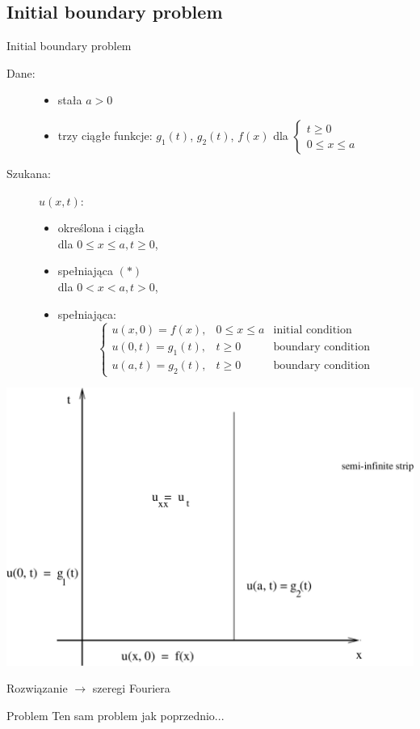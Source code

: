\subsection{Initial boundary problem}

\begin{frame}{Initial boundary problem}
  \begin{description}
    \item[Dane:]
      \begin{itemize}
        \item stała $a>0$
        \item trzy ciągłe funkcje: $g_1(t)$, $g_2(t)$, $f(x)$ dla $ \left\{ \begin{array}{l} t \ge 0 \\ 0 \le x \le a \end{array} \right. $
      \end{itemize}
    \item[Szukana:]
      $u(x,t)$:
      \begin{itemize}
        \item określona i ciągła \\ dla $0 \le x \le a, t \ge 0$,
        \item spełniająca $(*)$ \\ dla $0 < x < a, t > 0$,
        \item spełniająca:
        $$ \left\{ \begin{array}{lrl}
        u(x,0) = f(x), & 0 \le x \le a & \text{initial condition} \\
        u(0,t) = g_1(t), & t \ge 0 & \text{boundary condition} \\
        u(a,t) = g_2(t), & t \ge 0 & \text{boundary condition}
        \end{array} \right. $$
      \end{itemize}
  \end{description}
\end{frame}

\begin{frame}
  \centerline{\includegraphics[height = 0.85 \textheight]{img/23/ibp}}
\end{frame}

\begin{frame}
  Rozwiązanie $\rightarrow$ szeregi Fouriera

  \begin{alertblock}{Problem}
    Ten sam problem jak poprzednio...
  \end{alertblock}
\end{frame}
